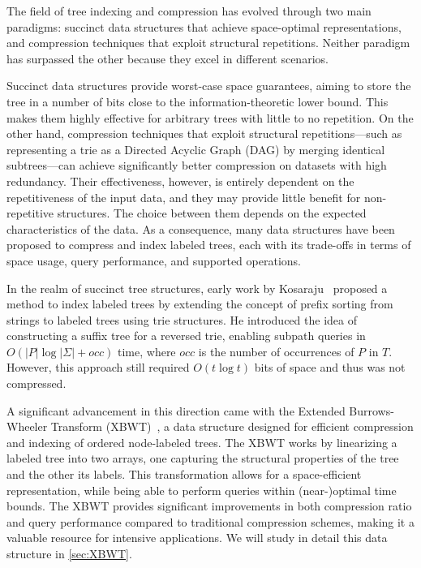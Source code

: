 The field of tree indexing and compression has evolved through two main paradigms: succinct data structures that achieve space-optimal representations, and compression techniques that exploit structural repetitions. Neither paradigm has surpassed the other because they excel in different scenarios. 

Succinct data structures provide worst-case space guarantees, aiming to store the tree in a number of bits close to the information-theoretic lower bound. This makes them highly effective for arbitrary trees with little to no repetition. On the other hand, compression techniques that exploit structural repetitions—such as representing a trie as a Directed Acyclic Graph (DAG) by merging identical subtrees—can achieve significantly better compression on datasets with high redundancy. Their effectiveness, however, is entirely dependent on the repetitiveness of the input data, and they may provide little benefit for non-repetitive structures. The choice between them depends on the expected characteristics of the data.
As a consequence, many data structures have been proposed to compress and index labeled trees, each with its trade-offs in terms of space usage, query performance, and supported operations. 

In the realm of succinct tree structures, early work by Kosaraju~\cite{kosaraju1989efficient} proposed a method to index labeled trees by extending the concept of prefix sorting from strings to labeled trees using trie structures. He introduced the idea of constructing a suffix tree for a reversed trie, enabling subpath queries in $O(|P|\log|\Sigma|+ occ)$ time, where $occ$ is the number of occurrences of $P$ in $T$. However, this approach still required $O(t \log t)$ bits of space
and thus was not compressed. 

A significant advancement in this direction came with the Extended Burrows-Wheeler Transform (XBWT)~\cite{ferragina2009compressing}, a data structure designed for efficient compression and indexing of ordered node-labeled trees. 
The XBWT works by linearizing a labeled tree into two arrays, one capturing the structural properties of the tree and the other its labels. 
This transformation allows for a space-efficient representation, while being able to perform queries within (near-)optimal time bounds. 
The XBWT provides significant improvements in both compression ratio and query performance compared to traditional compression schemes, making it a valuable resource for intensive applications.
We will study in detail this data structure in \cref{sec:XBWT}.


